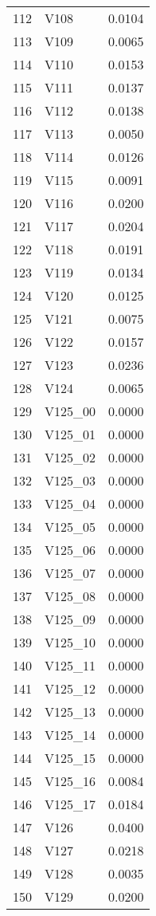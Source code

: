 \documentclass{amsart}
\begin{document}
\begin{longtable}{rlr}
  112 & V108 & 0.0104 \\ 
  113 & V109 & 0.0065 \\ 
  114 & V110 & 0.0153 \\ 
  115 & V111 & 0.0137 \\ 
  116 & V112 & 0.0138 \\ 
  117 & V113 & 0.0050 \\ 
  118 & V114 & 0.0126 \\ 
  119 & V115 & 0.0091 \\ 
  120 & V116 & 0.0200 \\ 
  121 & V117 & 0.0204 \\ 
  122 & V118 & 0.0191 \\ 
  123 & V119 & 0.0134 \\ 
  124 & V120 & 0.0125 \\ 
  125 & V121 & 0.0075 \\ 
  126 & V122 & 0.0157 \\ 
  127 & V123 & 0.0236 \\ 
  128 & V124 & 0.0065 \\ 
  129 & V125\_00 & 0.0000 \\ 
  130 & V125\_01 & 0.0000 \\ 
  131 & V125\_02 & 0.0000 \\ 
  132 & V125\_03 & 0.0000 \\ 
  133 & V125\_04 & 0.0000 \\ 
  134 & V125\_05 & 0.0000 \\ 
  135 & V125\_06 & 0.0000 \\ 
  136 & V125\_07 & 0.0000 \\ 
  137 & V125\_08 & 0.0000 \\ 
  138 & V125\_09 & 0.0000 \\ 
  139 & V125\_10 & 0.0000 \\ 
  140 & V125\_11 & 0.0000 \\ 
  141 & V125\_12 & 0.0000 \\ 
  142 & V125\_13 & 0.0000 \\ 
  143 & V125\_14 & 0.0000 \\ 
  144 & V125\_15 & 0.0000 \\ 
  145 & V125\_16 & 0.0084 \\ 
  146 & V125\_17 & 0.0184 \\ 
  147 & V126 & 0.0400 \\ 
  148 & V127 & 0.0218 \\ 
  149 & V128 & 0.0035 \\ 
  150 & V129 & 0.0200 \\ 

\end{longtable}
\end{document}
